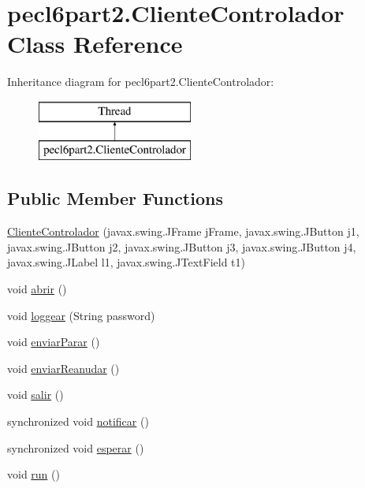\hypertarget{classpecl6part2_1_1_cliente_controlador}{}\section{pecl6part2.\+Cliente\+Controlador Class Reference}
\label{classpecl6part2_1_1_cliente_controlador}
Inheritance diagram for pecl6part2.\+Cliente\+Controlador\+:\begin{figure}[H]
\begin{center}
\leavevmode
\includegraphics[height=2.000000cm]{classpecl6part2_1_1_cliente_controlador}
\end{center}
\end{figure}
\subsection*{Public Member Functions}
\begin{DoxyCompactItemize}
\item 
\mbox{\hyperlink{classpecl6part2_1_1_cliente_controlador_a6e526681bd2137858bfb2940eeb23cc8}{Cliente\+Controlador}} (javax.\+swing.\+J\+Frame j\+Frame, javax.\+swing.\+J\+Button j1, javax.\+swing.\+J\+Button j2, javax.\+swing.\+J\+Button j3, javax.\+swing.\+J\+Button j4, javax.\+swing.\+J\+Label l1, javax.\+swing.\+J\+Text\+Field t1)
\item 
void \mbox{\hyperlink{classpecl6part2_1_1_cliente_controlador_a77cde1bf892e57d766c03a80a107d2f9}{abrir}} ()
\item 
void \mbox{\hyperlink{classpecl6part2_1_1_cliente_controlador_acaff5088389f8aa5f3571c802b910d28}{loggear}} (String password)
\item 
void \mbox{\hyperlink{classpecl6part2_1_1_cliente_controlador_ab228718d193754ecf65492b86d5be0d4}{enviar\+Parar}} ()
\item 
void \mbox{\hyperlink{classpecl6part2_1_1_cliente_controlador_af4b9fc77a65fa32d6d9fd5ae39da2b30}{enviar\+Reanudar}} ()
\item 
void \mbox{\hyperlink{classpecl6part2_1_1_cliente_controlador_a69a201c1f92fec9afb9f0729f784c489}{salir}} ()
\item 
synchronized void \mbox{\hyperlink{classpecl6part2_1_1_cliente_controlador_a34f39a3db52b361b1fa0ec5213cd8e24}{notificar}} ()
\item 
synchronized void \mbox{\hyperlink{classpecl6part2_1_1_cliente_controlador_af39e4985e3ba35a96c459f1713fa389a}{esperar}} ()
\item 
void \mbox{\hyperlink{classpecl6part2_1_1_cliente_controlador_a2ff467a81804aead5a07c2da9e279920}{run}} ()
\end{DoxyCompactItemize}
